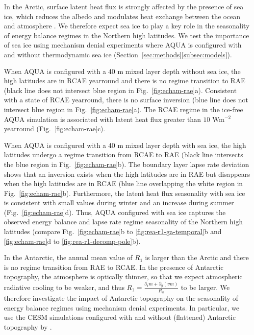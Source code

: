 \documentclass{ametsocV5}
\begin{document}
  In the Arctic, surface latent heat flux is strongly affected by the presence of sea ice, which reduces the albedo and modulates heat exchange between the ocean and atmosphere \citep{andreas1979, maykut1982}. We therefore expect sea ice to play a key role in the seasonality of energy balance regimes in the Northern high latitudes. We test the importance of sea ice using mechanism denial experiments where AQUA is configured with and without thermodynamic sea ice (Section~\ref{sec:methods}\ref{subsec:models}).
  
  When AQUA is configured with a 40 m mixed layer depth without sea ice, the high latitudes are in RCAE yearround and there is no regime transition to RAE (black line does not intersect blue region in Fig.~\ref{fig:echam-rae}a). Consistent with a state of RCAE yearround, there is no surface inversion (blue line does not intersect blue region in Fig.~\ref{fig:echam-rae}a). The RCAE regime in the ice-free AQUA simulation is associated with latent heat flux greater than $10$ Wm$^{-2}$ yearround (Fig.~\ref{fig:echam-rae}c).
  
  When AQUA is configured with a 40 m mixed layer depth with sea ice, the high latitudes undergo a regime transition from RCAE to RAE (black line intersects the blue region in Fig.~\ref{fig:echam-rae}b). The boundary layer lapse rate deviation shows that an inversion exists when the high latitudes are in RAE but disappears when the high latitudes are in RCAE (blue line overlapping the white region in Fig.~\ref{fig:echam-rae}b). Furthermore, the latent heat flux seasonality with sea ice is consistent with small values during winter and an increase during summer (Fig.~\ref{fig:echam-rae}d). Thus, AQUA configured with sea ice captures the observed energy balance and lapse rate regime seasonality of the Northern high latitudes (compare Fig.~\ref{fig:echam-rae}b to \ref{fig:rea-r1-ga-temporal}b and \ref{fig:echam-rae}d to \ref{fig:rea-r1-decomp-pole}b).

  In the Antarctic, the annual mean value of $R_1$ is larger than the Arctic and there is no regime transition from RAE to RCAE. In the presence of Antarctic topography, the atmosphere is optically thinner, so that we expect atmospheric radiative cooling to be weaker, and thus $R_1=\frac{\partial_t m + \partial_y (vm)}{R_a}$ to be larger. We therefore investigate the impact of Antarctic topography on the seasonality of energy balance regimes using mechanism denial experiments. In particular, we use the CESM simulations configured with and without (flattened) Antarctic topography by \cite{hahn2020}.
\end{document}
